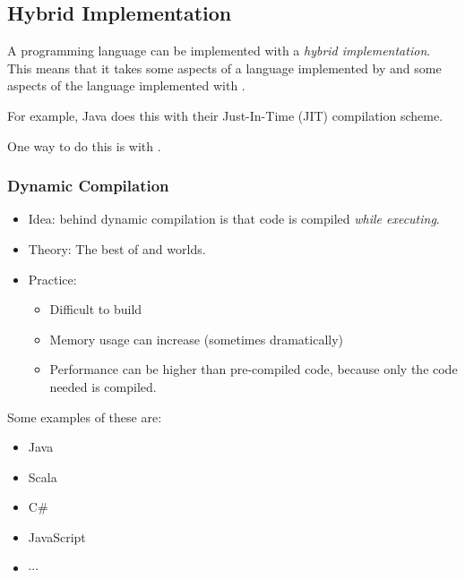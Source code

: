 \subsection{Hybrid Implementation}\label{subsec:Hybrid_Implementation}
\begin{definition}\label{def:Hybrid_Implementation}
  A programming language can be implemented with a \emph{hybrid implementation}.
  This means that it takes some aspects of a language implemented by  and some aspects of the language implemented with .

  For example, Java does this with their Just-In-Time (JIT) compilation scheme.
\end{definition}

One way to do this is with .
\subsubsection{Dynamic Compilation}\label{subsubsec:Dynamic_Compilation}
\begin{itemize}[noitemsep]
\item Idea: behind dynamic compilation is that code is compiled \emph{while executing}.
\item Theory: The best of  and  worlds.
\item Practice:
  \begin{itemize}[noitemsep]
  \item Difficult to build
  \item Memory usage can increase (sometimes dramatically)
  \item Performance can be higher than pre-compiled code, because only the code needed is compiled.
  \end{itemize}
\end{itemize}

Some examples of these are:
\begin{itemize}[noitemsep]
\item Java
\item Scala
\item C\#
\item JavaScript
\item $\cdots$
\end{itemize}


